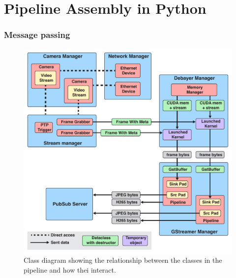 
\chapter{Pipeline Assembly in Python}
\label{chap:pipeline}
\subsection{Message passing}

\begin{figure}
    \centering
    \includegraphics[width=\textwidth]{figures/object_overview.pdf}
    \caption{Class diagram showing the relationship between the classes in the pipeline and how thei interact.}
    \label{fig:pipeline_current}
\end{figure}